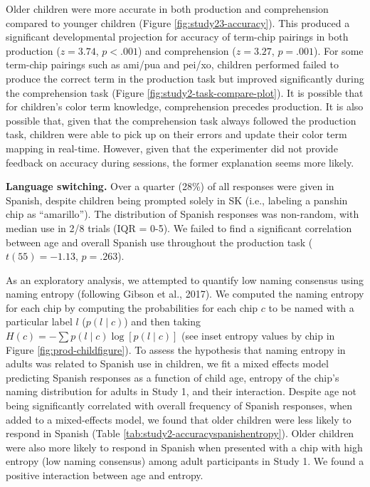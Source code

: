 \documentclass[
  english,
  ,man,floatsintext]{apa6}
\begin{document}
Older children were more accurate in both production and comprehension compared to younger children (Figure \ref{fig:study23-accuracy}). This produced a significant developmental projection for accuracy of term-chip pairings in both production (\(z = 3.74\), \(p < .001\)) and comprehension (\(z = 3.27\), \(p = .001\)). For some term-chip pairings such as ami/pua and pei/xo, children performed failed to produce the correct term in the production task but improved significantly during the comprehension task (Figure \ref{fig:study2-task-compare-plot}). It is possible that for children's color term knowledge, comprehension precedes production. It is also possible that, given that the comprehension task always followed the production task, children were able to pick up on their errors and update their color term mapping in real-time. However, given that the experimenter did not provide feedback on accuracy during sessions, the former explanation seems more likely.

\textbf{Language switching.} Over a quarter (28\%) of all responses were given in Spanish, despite children being prompted solely in SK (i.e., labeling a panshin chip as \enquote{amarillo}). The distribution of Spanish responses was non-random, with median use in 2/8 trials (IQR = 0-5). We failed to find a significant correlation between age and overall Spanish use throughout the production task (\(t(55) = -1.13\), \(p = .263\)).

As an exploratory analysis, we attempted to quantify low naming consensus using naming entropy (following Gibson et al., 2017). We computed the naming entropy for each chip by computing the probabilities for each chip \(c\) to be named with a particular label \(l\) (\(p(l \mid c)\)) and then taking \(H(c) = - \sum{p(l\mid c) \log[p(l \mid c)]}\) (see inset entropy values by chip in Figure \ref{fig:prod-childfigure}).
To assess the hypothesis that naming entropy in adults was related to Spanish use in children, we fit a mixed effects model predicting Spanish responses as a function of child age, entropy of the chip's naming distribution for adults in Study 1, and their interaction. Despite age not being significantly correlated with overall frequency of Spanish responses, when added to a mixed-effects model, we found that older children were less likely to respond in Spanish (Table \ref{tab:study2-accuracyspanishentropy}). Older children were also more likely to respond in Spanish when presented with a chip with high entropy (low naming consensus) among adult participants in Study 1. We found a positive interaction between age and entropy.
\end{document}

